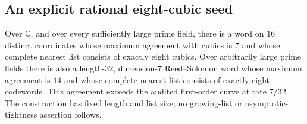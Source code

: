 \subsection{An explicit rational eight-cubic seed}
\label{app:eight-cubic-smooth-seed}

\begin{theorem}
\label{thm:eight-cubic-smooth-seed}
Over $\mathbb Q$, and over every sufficiently large prime field, there is a word on $16$ distinct coordinates whose maximum agreement with cubics is $7$ and whose complete nearest list consists of exactly eight cubics. Over arbitrarily large prime fields there is also a length-$32$, dimension-$7$ Reed--Solomon word whose maximum agreement is $14$ and whose complete nearest list consists of exactly eight codewords. This agreement exceeds the audited first-order curve at rate $7/32$. The construction has fixed length and list size; no growing-list or asymptotic-tightness assertion follows.
\end{theorem}

